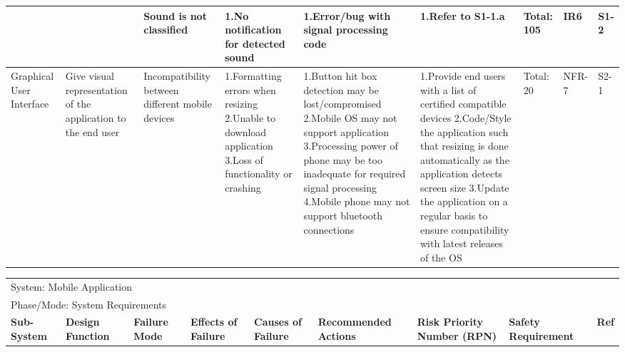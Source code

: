 \documentclass[12pt, titlepage]{article}
\begin{document}
\begin{landscape}
\begin{table}[H]
\begin{tabular}{| p{} | p{}  | p{} | p{} | p{} | p{} | p{} | p{} | p{} |}
     & & Sound is not classified & 1.No notification for detected sound & 1.Error/bug with signal processing code & 1.Refer to S1-1.a & Total: 105 & IR6 & S1-2 \\ \hline

    Graphical User Interface & Give visual representation of the application to the end user & Incompatibility between different mobile devices  & 1.Formatting errors when resizing \newline 2.Unable to download application \newline 3.Loss of functionality or crashing & 1.Button hit box detection may be lost/compromised \newline 2.Mobile OS may not support application \newline 3.Processing power of phone may be too  inadequate for required signal processing \newline 4.Mobile phone may not support bluetooth connections  & 1.Provide end users with a list of certified compatible devices \newline 2.Code/Style the application such that resizing is done automatically as the application detects screen size \newline 3.Update the application on a regular basis to ensure compatibility with latest releases of the OS  & Total: 20 & NFR-7 & S2-1 \\ \cline{1-9}

    \end{tabular}
\end{table}

\begin{table}[H]

    \centering
    \begin{tabular}{| p{} | p{}  | p{} | p{} | p{} | p{} | p{} | p{} | p{} |}
     \hline
    
    \multicolumn{9}{|l|}{System: Mobile Application } \\
    \multicolumn{9}{|l|}{Phase/Mode: System Requirements} \\ \hline
    \textbf{Sub-System} & \textbf{Design Function} & \textbf{Failure Mode} & \textbf{Effects of Failure} & \textbf{Causes of Failure} & \textbf{Recommended Actions} & \textbf{Risk Priority Number (RPN)} & \textbf{Safety Requirement} & \textbf{Ref} \\ \hline


\end{tabular}
\end{table}
\end{landscape}
\end{document}
